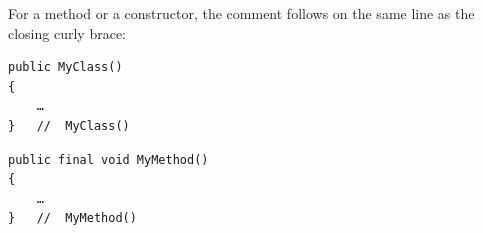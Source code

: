 For a method or a constructor, the comment follows on the same line as the closing curly brace:
\begin{lstlisting}
public MyClass()
{ 
    … 
}   //  MyClass()
\end{lstlisting}
\begin{lstlisting}
public final void MyMethod()
{ 
    … 
}   //  MyMethod()
\end{lstlisting}

